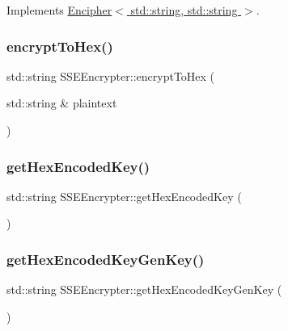 Implements \hyperlink{classEncipher_aaf8138eb280608bfd03c6eb762ffc010}{Encipher$<$ std\+::string, std\+::string $>$}.

\mbox{\label{classSSEEncrypter_a54465123beb996dc0410c8f8c4ec2ba6}} 
\subsubsection{\texorpdfstring{encrypt\+To\+Hex()}{encryptToHex()}}
{\footnotesize\ttfamily std\+::string S\+S\+E\+Encrypter\+::encrypt\+To\+Hex (\begin{DoxyParamCaption}\item[{std\+::string \&}]{plaintext }\end{DoxyParamCaption})}

\mbox{\label{classSSEEncrypter_a741ba1ef98a1f1b294ed3904738cd888}} 
\subsubsection{\texorpdfstring{get\+Hex\+Encoded\+Key()}{getHexEncodedKey()}}
{\footnotesize\ttfamily std\+::string S\+S\+E\+Encrypter\+::get\+Hex\+Encoded\+Key (\begin{DoxyParamCaption}{ }\end{DoxyParamCaption})}

\mbox{\label{classSSEEncrypter_abaefa48cff26cad49a17a1bd2586dbc7}} 
\subsubsection{\texorpdfstring{get\+Hex\+Encoded\+Key\+Gen\+Key()}{getHexEncodedKeyGenKey()}}
{\footnotesize\ttfamily std\+::string S\+S\+E\+Encrypter\+::get\+Hex\+Encoded\+Key\+Gen\+Key (\begin{DoxyParamCaption}{ }\end{DoxyParamCaption})}

